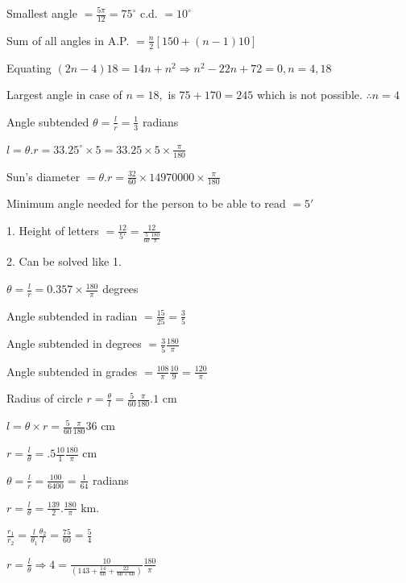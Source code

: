     Smallest angle $= \frac{5\pi}{12} = 75^\circ$ c.d. $= 10^\circ$

    Sum of all angles in A.P. $= \frac{n}{2}[150 + (n - 1)10]$

    Equating $(2n - 4)18 = 14n + n^2 \Rightarrow n^2 - 22n + 72 = 0, n = 4, 18$

    Largest angle in case of $n = 18,$ is $75 + 170 = 245$ which is not possible. $\therefore n = 4$
\item Angle subtended $\theta = \frac{l}{r} = \frac{1}{3}$ radians
\item $l = \theta . r = 33.25^\circ \times 5 = 33.25\times 5 \times \frac{\pi}{180}$
\item Sun's diameter $= \theta .r = \frac{32}{60}\times 14970000\times \frac{\pi}{180}$
\item Minimum angle needed for the person to be able to read $= 5'$

    1. Height of letters $= \frac{12}{5'} = \frac{12}{\frac{5}{60}\frac{180}{\pi}}$

    2. Can be solved like 1.
\item $\theta = \frac{l}{r} = 0.357\times \frac{180}{\pi}$ degrees
\item Angle subtended in radian $= \frac{15}{25} = \frac{3}{5}$

    Angle subtended in degrees $= \frac{3}{5}\frac{180}{\pi}$

    Angle subtended in grades $= \frac{108}{\pi}\frac{10}{9} = \frac{120}{\pi}$
\item Radius of circle $r = \frac{\theta}{l} = \frac{5}{60}\frac{\pi}{180}.1$ cm
\item $l = \theta \times r = \frac{5}{60}\frac{\pi}{180}36$ cm

\item $r = \frac{l}{\theta} = .5 \frac{10}{1}\frac{180}{\pi}$ cm

\item $\theta = \frac{l}{r} = \frac{100}{6400} = \frac{1}{64}$ radians

\item $r = \frac{l}{\theta} = \frac{139}{2}.\frac{180}{\pi}$ km.

\item $\frac{r_1}{r_2} = \frac{l}{\theta_1}\frac{\theta_2}{l} = \frac{75}{60} = \frac{5}{4}$

\item $r = \frac{l}{\theta} \Rightarrow 4 = \frac{10}{\left(143 + \frac{14}{60} + \frac{22}{60\times
    60}\right)}\frac{180}{\pi}$


